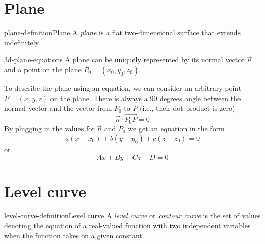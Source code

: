 \documentclass[preview]{standalone}
\begin{document}
\genpage

\section{Plane}

\begin{snippetdefinition}{plane-definition}{Plane}
    A \textit{plane} is a flat two-dimensional surface that extends indefinitely.
\end{snippetdefinition}

\begin{snippet}{3d-plane-equations}
A plane can be uniquely represented by its
normal vector \(\vec{n}\)
and a point on the plane \(P_0=(x_0, y_0, z_0)\).

To describe the plane using an equation, we can
consider an arbitrary point \(P=(x,y,z)\) on the plane.
There is always a 90 degrees angle between the normal
vector and the vector from \(P_0\) to \(P\) (i.e., their dot product is zero)
\[
    \vec{n} \cdot \overrightarrow{P_0 P} = 0
\]
By plugging in the values for \(\vec{n}\) and \(P_0\)
we get an equation in the form
\[
    a(x-x_0) + b(y-y_0) + c(z-z_0) = 0
\]
or
\[
    Ax+By+Cz+D=0
\]
\end{snippet}

\section{Level curve}


\begin{snippetdefinition}{level-curve-definition}{Level curve}
    A \textit{level curve} or \textit{contour curve}
    is the set of values denoting the equation
    of a real-valued function with two independent variables
    when the function takes on a given constant.
\end{snippetdefinition}


\end{document}
